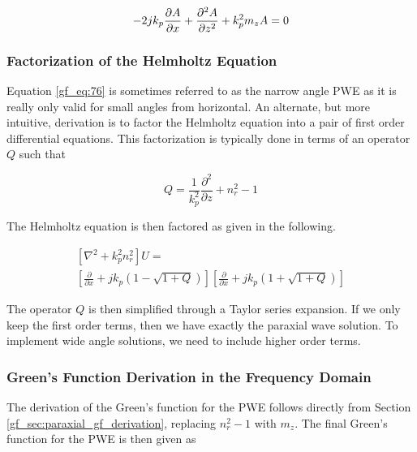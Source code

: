 \begin{equation}
-2jk_p\frac{\partial A}{\partial x} + \frac{\partial^2 A}{\partial z^2} +k_p^2m_zA = 0 \\
\label{gf_eq:76}
\end{equation}
\renewcommand{\baselinestretch}{2} \small\normalsize

\subsubsection{Factorization of the Helmholtz Equation}
Equation \ref{gf_eq:76} is sometimes referred to as the narrow angle PWE as it is really only valid for small angles from horizontal. An alternate, but more intuitive, derivation is to factor the Helmholtz equation into a pair of first order differential equations. This factorization is typically done in terms of an operator $Q$ \cite{kuttler_pe_theory} \cite{dockery_pe} such that

\begin{equation}
Q = \frac{1}{k_p^2}\frac{\partial^2}{\partial z} + n_r^2-1
\label{gf_pwe:1}
\end{equation}
\renewcommand{\baselinestretch}{2} \small\normalsize

The Helmholtz equation is then factored as given in the following.

\begin{equation}
\begin{gathered}
\left[\nabla^2 + k_p^2n_r^2\right]U = \\
\left[\frac{\partial}{\partial x}+jk_p\left(1-\sqrt{1+Q} \right) \right]\left[\frac{\partial}{\partial x}+jk_p\left(1+\sqrt{1+Q} \right)\right]
\end{gathered}
\label{gf_pwe:2}
\end{equation}
\renewcommand{\baselinestretch}{2} \small\normalsize

The operator $Q$ is then simplified through a Taylor series expansion. If we only keep the first order terms, then we have exactly the paraxial wave solution. To implement wide angle solutions, we need to include higher order terms.

\subsubsection{Green's Function Derivation in the Frequency Domain}
The derivation of the Green's function for the PWE follows directly from Section \ref{gf_sec:paraxial_gf_derivation}, replacing $n_r^2-1$ with $m_z$. The final Green's function for the PWE is then given as

